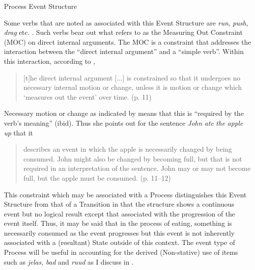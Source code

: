 \ea%
\label{ex:4:8}
Process Event Structure \citep[56]{Pustejovsky1991}
\begin{center}\fbox{\parbox{5cm}{\centering
\begin{forest}
[P
  [e$_1$,no edge]
  [~~~...~~~,roof]
  [e$_n$, no edge]
]
\end{forest}
}}\end{center}
\z

Some verbs that are noted as associated with this Event Structure are
\textit{run}, \textit{push}, \textit{drag} etc. \citep[56]{Pustejovsky1991}.  
Such verbs bear out what \citet{Tenny1994} refers to as the Measuring Out
Constraint (MOC) on direct internal arguments.  The MOC is a
constraint that addresses the interaction between the “direct internal
argument” and a “simple verb”. Within this interaction, according to
\citet{Tenny1994},

\begin{quote}
[t]he direct internal argument [...] is constrained so that it
undergoes no necessary internal motion or change, unless it is motion
or change which ‘measures out the event’ over time. (p. 11)
\end{quote}

Necessary motion or change as indicated by \citet{Tenny1994} means
that this is “required by the verb’s meaning” (ibid).  Thus she points
out for the sentence \textit{John ate the apple up} that it


\begin{quote}
describes an event in which the apple is necessarily changed by being
consumed.  John might also be changed by becoming full, but that is
not required in an interpretation of the sentence. John may or may not
become full, but the apple must be consumed. (p. 11--12)
\end{quote}

This constraint which may be associated with a Process distinguishes
this Event Structure from that of a Transition in that the structure
shows a continuous event but no logical result except that associated
with the progression of the event itself.  Thus, it may be said that
in the process of eating, something is necessarily consumed as the
event progresses but this event is not inherently associated with a
(resultant) State outside of this context.  The event type of Process
will be useful in accounting for the derived (Non-stative) use of
items such as \textit{jelas, bad} and \textit{ruud} as I discuss in
.

